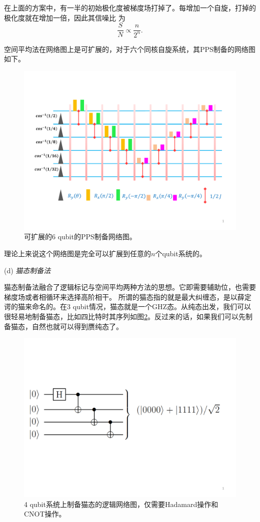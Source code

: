 在上面的方案中，有一半的初始极化度被梯度场打掉了。每增加一个自旋，打掉的极化度就在增加一倍，因此其信噪比
为
 \begin{equation}\label{aaa}
\frac{S}{N}\propto \frac{n}{2^n}.
\end{equation}

空间平均法在网络图上是可扩展的，对于六个同核自旋系统，其PPS制备的网络图如下。
\begin{figure}[htbp]
            \begin{center}
              \includegraphics[width= 0.8\columnwidth]{figures/spatial.pdf}
              \caption{可扩展的6 qubit的PPS制备网络图。
              }
              \label{spatial}
            \end{center}
\end{figure}
理论上来说这个网络图是完全可以扩展到任意的$n$个qubit系统的。

(d) \emph{猫态制备法}

猫态制备法\cite{pps3}融合了逻辑标记与空间平均两种方法的思想。它即需要辅助位，也需要梯度场或者相循环来选择高阶相干。
所谓的猫态指的就是最大纠缠态，是以薛定谔的猫来命名的。在3 qubit情况，猫态就是一个GHZ态。从纯态出发，我们可以很轻易地制备猫态，比如四比特时其序列如图\ref{cat}。反过来的话，如果我们可以先制备猫态，自然也就可以得到赝纯态了。

\begin{figure}[htbp]
            \begin{center}
              \includegraphics[width= 0.8\columnwidth]{figures/cat.pdf}
              \caption{4 qubit系统上制备猫态的逻辑网络图，仅需要Hadamard操作和CNOT操作。
              }
              \label{cat}
            \end{center}
\end{figure}

